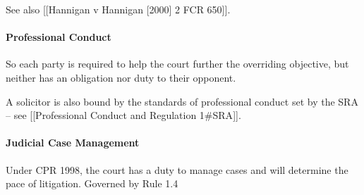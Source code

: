 \documentclass[
]{article}
\begin{document}
See also {[}{[}Hannigan v Hannigan {[}2000{]} 2 FCR 650{]}{]}.

\hypertarget{professional-conduct}{%
\paragraph{Professional Conduct}\label{professional-conduct}}

So each party is required to help the court further the overriding
objective, but neither has an obligation nor duty to their opponent.

A solicitor is also bound by the standards of professional conduct set
by the SRA -- see {[}{[}Professional Conduct and Regulation
1\#SRA{]}{]}.

\hypertarget{judicial-case-management}{%
\paragraph{Judicial Case Management}\label{judicial-case-management}}

Under CPR 1998, the court has a duty to manage cases and will determine
the pace of litigation. Governed by Rule 1.4
\end{document}
